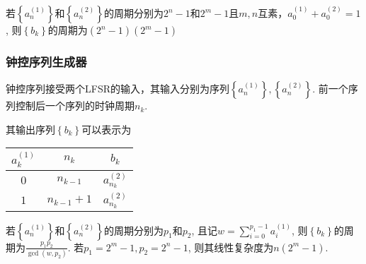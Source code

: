 \documentclass[UTF8]{ctexrep}
\newcommand{\ext}{\displaystyle}
\def\pth#1{\left( {#1}\right)}
\def\brace#1{\left\{ {#1} \right\}}
\begin{document}
若$\brace{a_n^{(1)}}$和$\brace{a_n^{(2)}}$的周期分别为$2^n-1$和$2^m-1$且$m, n$互素，$a_0^{(1)}+a_0^{(2)}=1$, 则$\brace{b_k}$的周期为$\pth{2^n-1}\pth{2^m-1}$
\subsubsection{钟控序列生成器}
钟控序列接受两个LFSR的输入，其输入分别为序列$\brace{a_n^{(1)}}, \brace{a_n^{(2)}}$. 前一个序列控制后一个序列的时钟周期$n_k$.\par
其输出序列$\brace{b_k}$可以表示为
\begin{table}[H]
    \centering
    \begin{tabular}{c|c|c}\hline
        $a_k^{(1)}$&$n_k$&$b_k$\\\hline
        $0$&$n_{k-1}$&$a_{n_k}^{(2)}$\\\hline
        $1$&$n_{k-1}+1$&$a_{n_k}^{(2)}$\\\hline
    \end{tabular}
\end{table}

若$\brace{a_n^{(1)}}$和$\brace{a_n^{(2)}}$的周期分别为$p_1$和$p_2$, 且记$\ext w=\sum_{i=0}^{p_1-1}a_i^{(1)}$, 则$\brace{b_k}$的周期为$\ext\frac{p_1p_2}{\gcd\pth{w, p_2}}$. 若$p_1=2^m-1, p_2=2^n-1$, 则其线性复杂度为$n\pth{2^m-1}$.
\end{document}
